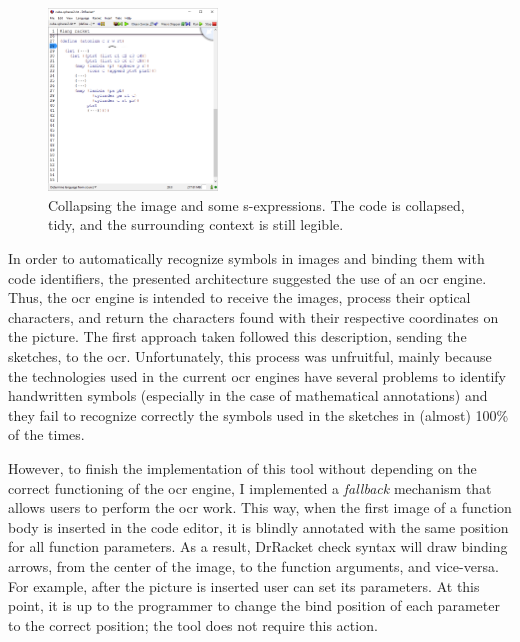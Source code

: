 \begin{figure}[!h]
\centering
  \includegraphics[width=0.4\textwidth]{images/atomium-collapsed}
  \caption{Collapsing the image and some s-expressions. The code is collapsed, tidy, and the surrounding context is still legible.}
  \label{fig:collapsed}
\end{figure}

In order to automatically recognize symbols in images and binding them with code identifiers, the presented architecture suggested the use of an \gls{ocr} engine. Thus, the \gls{ocr} engine is intended to receive the images, process their optical characters, and return the characters found with their respective coordinates on the picture. The first approach taken followed this description, sending the sketches, to the \gls{ocr}. Unfortunately, this process was unfruitful, mainly because the technologies used in the current \gls{ocr} engines have several problems to identify handwritten symbols (especially in the case of mathematical annotations) and they fail to recognize correctly the symbols used in the sketches in (almost) 100\% of the times.

However, to finish the implementation of this tool without depending on the correct functioning of the \gls{ocr} engine, I implemented a \textit{fallback} mechanism that allows users to perform the \gls{ocr} work. This way, when the first image of a function body is inserted in the code editor, it is blindly annotated with the same position for all function parameters. As a result, DrRacket check syntax will draw binding arrows, from the center of the image, to the function arguments, and vice-versa. For example, after the picture is inserted user can set its parameters. At this point, it is up to the programmer to change the bind position of each parameter to the correct position; the tool does not require this action. 

